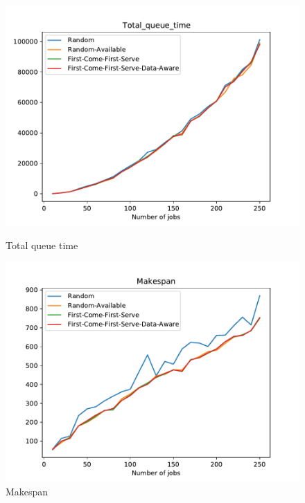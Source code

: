 \documentclass[a4paper]{article}
\begin{document}
\begin{figure}[ht]
\begin{minipage}[b]{0.5\linewidth}
    \centering
    \includegraphics[width=1.11\linewidth]{MBSS/plot/Total_queue_time.pdf} 
    \caption{Total queue time} 
    \vspace{4ex}
  \end{minipage}%
  \begin{minipage}[b]{0.5\linewidth}
    \centering
    \includegraphics[width=1.11\linewidth]{MBSS/plot/Makespan.pdf} 
    \caption{Makespan} 
    \vspace{4ex}
  \end{minipage} 
\end{figure}
\end{document}
